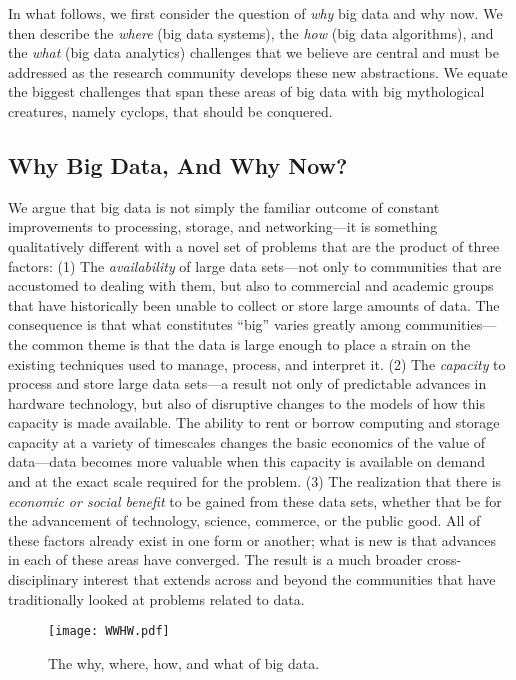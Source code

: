 \documentclass{article}
\begin{document}
In what follows, we first consider the question of \emph{why} big data and why now.  We then describe the \emph{where} (big data systems), the \emph{how} (big data algorithms), and the \emph{what} (big data analytics) challenges that we believe are central and must be addressed as the research community develops these new abstractions. 
We equate the biggest challenges that span these areas of big data with big mythological creatures, namely cyclops, that should be conquered.  

\subsection*{Why Big Data, And Why Now?}

We argue that big data is not simply the familiar outcome of constant improvements to processing, storage, and networking---it is something qualitatively different with a novel set of problems that are the product of three factors:
(1) The \emph{availability} of large data sets---not only to communities that
are accustomed to dealing with them, but also to commercial and academic groups
that have historically been unable to collect or store large amounts of data.
The consequence is that what constitutes ``big'' varies greatly among 
communities---the common theme is that the data is large enough to place
a strain on the existing techniques used to manage, process, and interpret it.
(2) The \emph{capacity} to process and store large data sets---a result not only
of predictable advances in hardware technology, but also of disruptive changes 
to the models of how this capacity is made available. The ability to rent or
borrow computing and storage capacity at a variety of timescales changes the
basic economics of the value of data---data becomes more valuable when this
capacity is available on demand and at the exact scale required for the problem.
(3) The realization that there is \emph{economic or social benefit} to be
gained from these data sets, whether that be for the advancement of technology,
science, commerce, or the public good.
All of these factors already exist in one form or another; what is new is that advances in each of these areas have converged.  The result is a much broader cross-disciplinary interest that extends across and beyond the communities that have traditionally looked at problems
related to data.

\begin{figure}
\begin{center}
\texttt{[image: WWHW.pdf]}
\end{center}
\caption{\label{fig:WWHW} The why, where, how, and what of big data.}
\end{figure}
\end{document}
